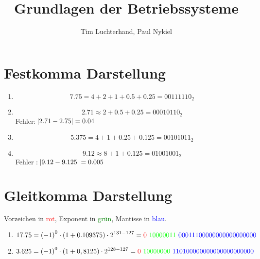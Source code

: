 \documentclass[DIN, pagenumber=false, fontsize=11pt, parskip=half]{scrartcl}
\title{Grundlagen der Betriebssysteme}
\author{Tim Luchterhand, Paul Nykiel}
\begin{document}
    \maketitle
    \section{Festkomma Darstellung}
    \begin{enumerate}[label=(\alph*)]
        \item 
            \begin{equation*}
                7.75 = 4 + 2 + 1 + 0.5 + 0.25 = {00111110}_2
            \end{equation*}
        \item
            \begin{equation*}
                2.71 \approx 2 + 0.5 + 0.25 = {00010110}_2
            \end{equation*}
            Fehler: $\abs{2.71 - 2.75} = 0.04$
        \item
            \begin{equation*}
                5.375 = 4 + 1 + 0.25 + 0.125 = {00101011}_2
            \end{equation*}
        \item
            \begin{equation*}
                9.12 \approx 8 + 1 + 0.125 = {01001001}_2
            \end{equation*}
            Fehler : $\abs{9.12 - 9.125} = 0.005$
    \end{enumerate}
    \section{Gleitkomma Darstellung}
    Vorzeichen in \textcolor{red}{rot}, Exponent in \textcolor{green}{grün}, Mantisse in \textcolor{blue}{blau}.
    \begin{enumerate}[label = (\alph*)]
        \item
            \begin{equation*}
                17.75 = {(-1)}^0 \cdot (1+0.109375) \cdot 2^{131-127} = \textcolor{red}{0}\ \textcolor{green}{10000011}\ \textcolor{blue}{00011100000000000000000}
            \end{equation*}
        \item 
            \begin{equation*}
                3.625 = {(-1)}^0 \cdot (1+0,8125) \cdot 2^{128 - 127} = \textcolor{red}{0}\ \textcolor{green}{10000000}\ \textcolor{blue}{110100000000000000000000}
            \end{equation*}
    \end{enumerate}
\end{document}
